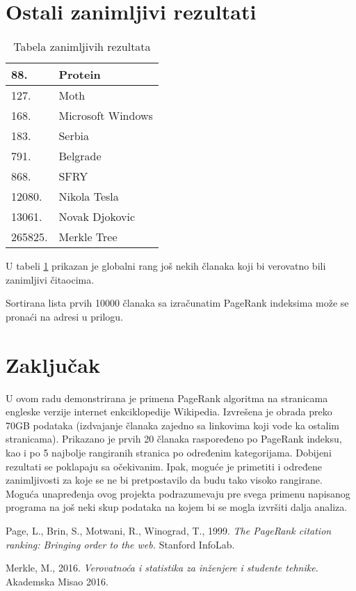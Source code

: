 \documentclass[12pt, journal, compsoc]{IEEEtran}
\begin{document}
\section*{Ostali zanimljivi rezultati}


\begin{table}[]
\large
\centering
\begin{tabular}{|l|l|}
\hline
88.                  & Protein \\ \hline
127.                 & Moth \\ \hline
168.                 & Microsoft Windows \\ \hline
183.                 & Serbia  \\ \hline
791.                 & Belgrade \\ \hline
868.                 & SFRY \\ \hline
12080.               & Nikola Tesla \\ \hline 
13061.               & Novak Djokovic \\ \hline 
265825.              & Merkle Tree \\ \hline 
\end{tabular}
\caption{Tabela zanimljivih rezultata}
\label{tabelazanimljivi}
\end{table}
U tabeli \ref{tabelazanimljivi} prikazan je globalni rang još nekih članaka koji bi verovatno bili zanimljivi čitaocima.

Sortirana lista prvih 10000 članaka sa izračunatim PageRank indeksima može se pronaći na adresi u prilogu.

\section{Zaključak}

U ovom radu demonstrirana je primena PageRank algoritma na stranicama engleske verzije internet enkciklopedije Wikipedia. Izvrešena je obrada preko 70GB podataka (izdvajanje članaka zajedno sa linkovima koji vode ka ostalim stranicama). Prikazano je prvih 20 članaka raspoređeno po PageRank indeksu, kao i po 5 najbolje rangiranih stranica po određenim kategorijama. Dobijeni rezultati se poklapaju sa očekivanim. Ipak, moguće je primetiti i određene zanimljivosti za koje se ne bi pretpostavilo da budu tako visoko rangirane. Moguća unapređenja ovog projekta podrazumevaju pre svega primenu napisanog programa na još neki skup podataka na kojem bi se mogla izvršiti dalja analiza.

\begin{thebibliography}{9}
Page, L., Brin, S., Motwani, R., Winograd, T., 1999. \textit{The PageRank citation ranking: Bringing order to the web.} Stanford InfoLab.

Merkle, M., 2016. \textit{Verovatnoća i statistika za inženjere i studente tehnike.} Akademska Misao 2016.
\end{thebibliography}
\end{document}
